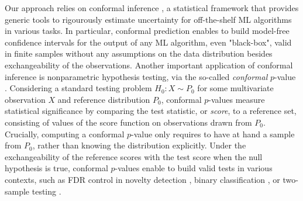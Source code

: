 \documentclass[a4paper, 11pt]{article}
\theoremstyle{remark}
\begin{document}

Our approach relies on conformal inference \citep{vovk2005algorithmic, balasubramanian2014conformal}, a statistical framework that provides generic tools to rigourously estimate uncertainty for off-the-shelf ML algorithms in various tasks. In particular, conformal prediction \citep{angelopoulos2021gentle, lei2014distribution, romano2019conformalized, romano2020classification, tibshirani2019conformal} enables to build model-free confidence intervals for the output of any ML algorithm, even "black-box", valid in finite samples without any assumptions on the data distribution besides exchangeability of the observations. Another important application of conformal inference is nonparametric hypothesis testing, via the so-called \textit{conformal} $p$-value \citep{vovk2005algorithmic, balasubramanian2014conformal, bates2023testing}.
Considering a standard testing problem $H_0 \colon X \sim P_0$ for some multivariate observation $X$ and reference distribution $P_0$, 
conformal $p$-values measure statistical significance by comparing the test statistic, or \textit{score}, to a reference set, consisting of values of the score function on observations drawn from $P_0$. 
Crucially, computing a conformal $p$-value only requires to have at hand a sample from $P_0$, rather than knowing the distribution explicitly. 
Under the exchangeability of the reference scores with the test score when the null hypothesis is true, conformal $p$-values enable to build valid tests in various contexts, such as FDR control in novelty detection \citep{bates2023testing, yang2021bonus, marandon22b, liang2022integrative}, binary classification \citep{rava2021burden,jin2022selection}, or two-sample testing \citep{hu2023two}.
\end{document}
